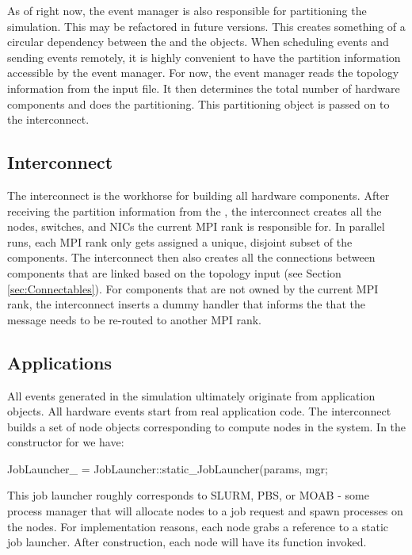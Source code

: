 As of right now, the event manager is also responsible for partitioning the simulation.
This may be refactored in future versions.
This creates something of a circular dependency between the  and the  objects.
When scheduling events and sending events remotely,
it is highly convenient to have the partition information accessible by the event manager.
For now, the event manager reads the topology information from the input file.
It then determines the total number of hardware components and does the partitioning.
This partitioning object is passed on to the interconnect.

\subsection{Interconnect}\label{subsec:interconnect}
The interconnect is the workhorse for building all hardware components.
After receiving the partition information from the ,
the interconnect creates all the nodes, switches, and NICs the current MPI rank is responsible for.
In parallel runs, each MPI rank only gets assigned a unique, disjoint subset of the components.
The interconnect then also creates all the connections between components that are linked based on the topology input (see Section \ref{sec:Connectables}).
For components that are not owned by the current MPI rank, the interconnect inserts a dummy handler that informs the 
that the message needs to be re-routed to another MPI rank.

\subsection{Applications}\label{subsec:apps}
All events generated in the simulation ultimately originate from application objects.
All hardware events start from real application code.
The interconnect builds a set of node objects corresponding to compute nodes in the system.
In the constructor for  we have:

\begin{CppCode}
JobLauncher_ = JobLauncher::static_JobLauncher(params, mgr;
\end{CppCode}

This job launcher roughly corresponds to SLURM, PBS, or MOAB - some process manager that will allocate nodes to a job request and spawn processes on the nodes. For implementation reasons, each node grabs a reference to a static job launcher.  After construction, each node will have its  function invoked.

